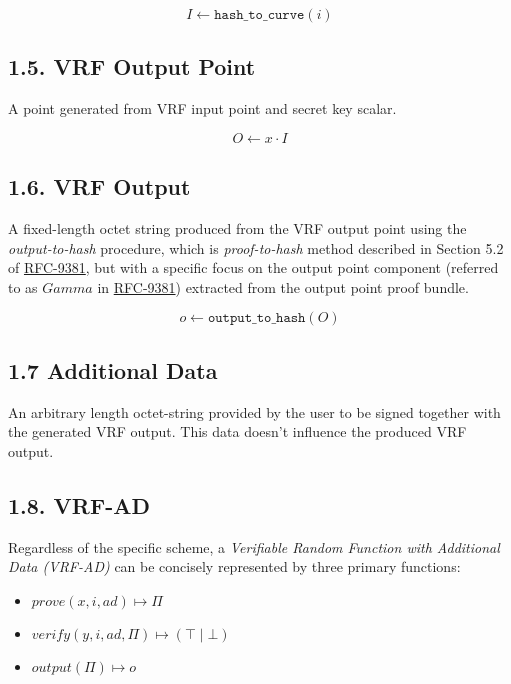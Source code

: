 \documentclass[
]{article}
\providecommand{\tightlist}{%
  \setlength{\itemsep}{0pt}\setlength{\parskip}{0pt}}
\begin{document}
\[I \gets \texttt{hash\_to\_curve}(i)\]

\subsection{1.5. VRF Output Point}\label{vrf-output-point}

A point generated from VRF input point and secret key scalar.

\[O \gets x \cdot I\]

\subsection{1.6. VRF Output}\label{vrf-output}

A fixed-length octet string produced from the VRF output point using the
\emph{output-to-hash} procedure, which is \emph{proof-to-hash} method
described in Section 5.2 of
\href{https://datatracker.ietf.org/doc/rfc9381}{RFC-9381}, but with a
specific focus on the output point component (referred to as \(Gamma\)
in \href{https://datatracker.ietf.org/doc/rfc9381}{RFC-9381}) extracted
from the output point proof bundle.

\[o \gets \texttt{output\_to\_hash}(O)\]

\subsection{1.7 Additional Data}\label{additional-data}

An arbitrary length octet-string provided by the user to be signed
together with the generated VRF output. This data doesn't influence the
produced VRF output.

\subsection{1.8. VRF-AD}\label{vrf-ad}

Regardless of the specific scheme, a \emph{Verifiable Random Function
with Additional Data (VRF-AD)} can be concisely represented by three
primary functions:

\begin{itemize}
\tightlist
\item
  \(prove(x, i, ad) \mapsto \Pi\)
\item
  \(verify(y, i, ad, \Pi) \mapsto (\top \mid \bot)\)
\item
  \(output(\Pi) \mapsto o\)
\end{itemize}
\end{document}
